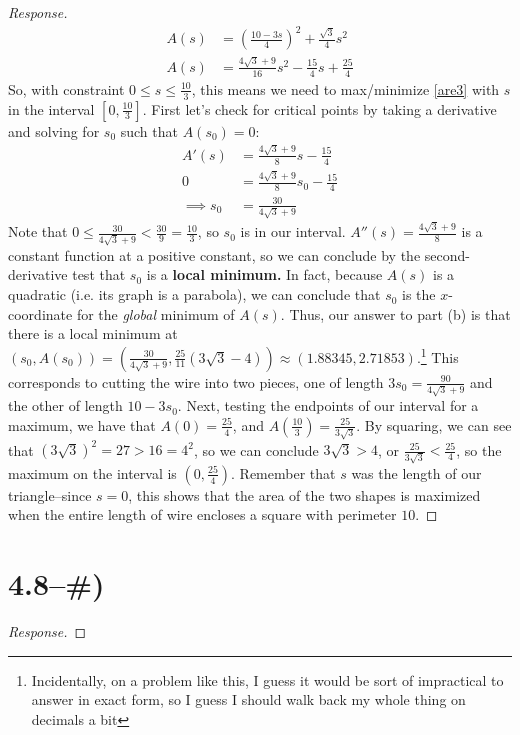 \documentclass[english]{article}
\theoremstyle{remark}
\theoremstyle{definition}
\begin{document}
\begin{proof}[Response]
\begin{align}
	A(s)&=\left(\frac{10-3s}{4}\right)^2+\frac{\sqrt{3}}{4}s^2\\
A(s)	&=\frac{4\sqrt{3}+9 }{16}s^2-\frac{15}{4}s+\frac{25}{4}\label{are3}
\end{align}
So, with constraint $0\leq s\leq \frac{10}{3}$, this means we need to max/minimize \eqref{are3} with $s$ in the interval $[0,\frac{10}{3}]$. First let's check for critical points by taking a derivative and solving for $s_0$ such that $A(s_0)=0$:
\begin{align*}
A'(s)&=\frac{4\sqrt{3}+9}{8}s-\frac{15}{4}\\
0&=\frac{4\sqrt{3} +9}{8}s_0-\frac{15}{4}\\
\implies s_0&= \frac{30}{4\sqrt{3}+9}
\end{align*} 
Note that $0\leq \frac{30}{4\sqrt{3}+9}<\frac{30}{9}=\frac{10}{3}$, so $s_0$ is in our interval. $A''(s)=\frac{4\sqrt{3}+9}{8}$ is a constant function at a positive constant, so we can conclude by the second-derivative test that $s_0$ is a \textbf{local minimum.} In fact, because $A(s)$ is a quadratic (i.e. its graph is a parabola), we can conclude that $s_0$ is the $x$-coordinate for the \emph{global} minimum of $A(s)$. Thus, our answer to part (b) is that there is a local minimum at $(s_0,A(s_0))=\left(\frac{30}{4\sqrt{3}+9},\frac{25}{11} \left(3 \sqrt{3}-4\right)\right)\approx(1.88345,2.71853)$.\footnote{Incidentally, on a problem like this, I guess it would be sort of impractical to answer in exact form, so I guess I should walk back my whole thing on decimals a bit\textellipsis} This corresponds to cutting the wire into two pieces, one of length $3s_0=\frac{90}{4\sqrt{3}+9}$ and the other of length $10-3s_0$. Next, testing the endpoints of our interval for a maximum, we have that $A(0)=\frac{25}{4}$, and $A(\frac{10}{3})=\frac{25}{3\sqrt{3}}$. By squaring, we can see that $(3\sqrt{3})^2=27>16=4^2$, so we can conclude $3\sqrt{3}>4$, or $\frac{25}{3\sqrt{3}}<\frac{25}{4}$, so the maximum on the interval is $(0,\frac{25}{4})$. Remember that $s$ was the length of our triangle--since $s=0$, this shows that the area of the two shapes is maximized when the entire length of wire encloses a square with perimeter $10$.
\end{proof}	\section*{4.8--\#) }
\begin{proof}[Response]

\end{proof}
\end{document}
